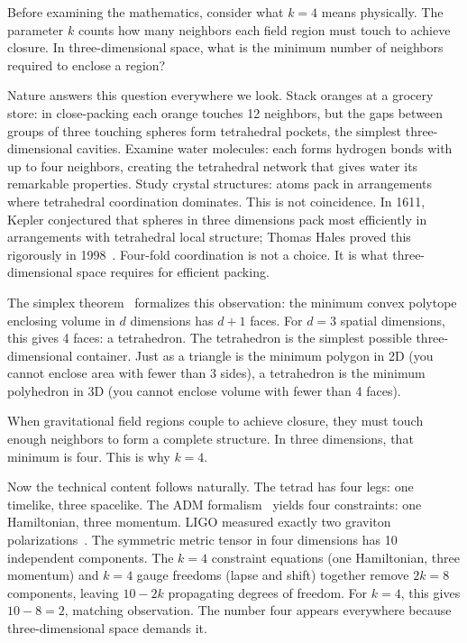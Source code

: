 \documentclass[aps,prd,preprint,superscriptaddress,showpacs,preprintnumbers,amsmath,amssymb,nofootinbib]{revtex4-2}
\begin{document}
Before examining the mathematics, consider what $k = 4$ means physically. The parameter $k$ counts how many neighbors each field region must touch to achieve closure. In three-dimensional space, what is the minimum number of neighbors required to enclose a region?

Nature answers this question everywhere we look. Stack oranges at a grocery store: in close-packing each orange touches 12 neighbors, but the gaps between groups of three touching spheres form tetrahedral pockets, the simplest three-dimensional cavities. Examine water molecules: each forms hydrogen bonds with up to four neighbors, creating the tetrahedral network that gives water its remarkable properties. Study crystal structures: atoms pack in arrangements where tetrahedral coordination dominates. This is not coincidence. In 1611, Kepler conjectured that spheres in three dimensions pack most efficiently in arrangements with tetrahedral local structure; Thomas Hales proved this rigorously in 1998~\cite{hales2005}. Four-fold coordination is not a choice. It is what three-dimensional space requires for efficient packing.

The simplex theorem~\cite{ziegler1995} formalizes this observation: the minimum convex polytope enclosing volume in $d$ dimensions has $d+1$ faces. For $d = 3$ spatial dimensions, this gives 4 faces: a tetrahedron. The tetrahedron is the simplest possible three-dimensional container. Just as a triangle is the minimum polygon in 2D (you cannot enclose area with fewer than 3 sides), a tetrahedron is the minimum polyhedron in 3D (you cannot enclose volume with fewer than 4 faces).

When gravitational field regions couple to achieve closure, they must touch enough neighbors to form a complete structure. In three dimensions, that minimum is four. This is why $k = 4$.

Now the technical content follows naturally. The tetrad has four legs: one timelike, three spacelike. The ADM formalism~\cite{adm1962} yields four constraints: one Hamiltonian, three momentum. LIGO measured exactly two graviton polarizations~\cite{gw170817}. The symmetric metric tensor in four dimensions has 10 independent components. The $k = 4$ constraint equations (one Hamiltonian, three momentum) and $k = 4$ gauge freedoms (lapse and shift) together remove $2k = 8$ components, leaving $10 - 2k$ propagating degrees of freedom. For $k = 4$, this gives $10 - 8 = 2$, matching observation. The number four appears everywhere because three-dimensional space demands it.
\end{document}

